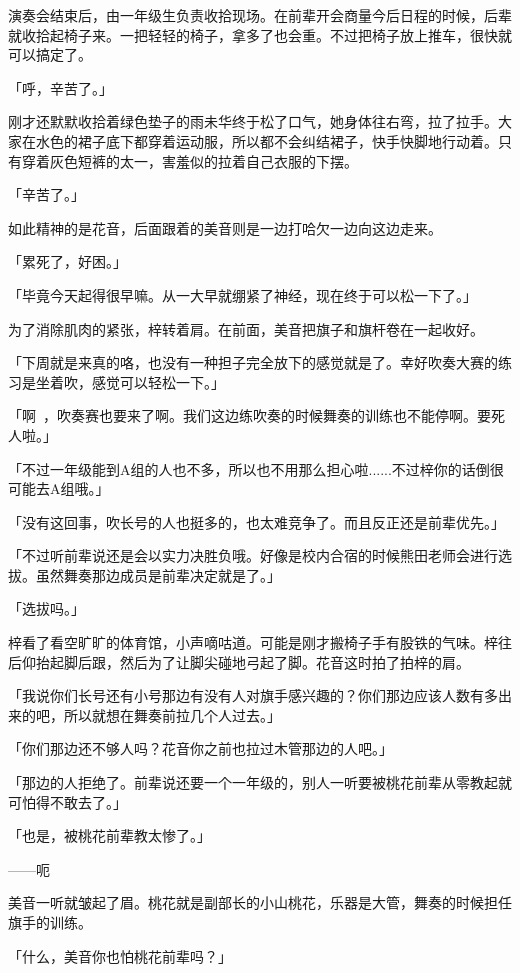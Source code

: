 \documentclass[UTF8]{ctexart}
\begin{document}
    演奏会结束后，由一年级生负责收拾现场。在前辈开会商量今后日程的时候，后辈就收拾起椅子来。一把轻轻的椅子，拿多了也会重。不过把椅子放上推车，很快就可以搞定了。

    「呼，辛苦了。」

    刚才还默默收拾着绿色垫子的雨未华终于松了口气，她身体往右弯，拉了拉手。大家在水色的裙子底下都穿着运动服，所以都不会纠结裙子，快手快脚地行动着。只有穿着灰色短裤的太一，害羞似的拉着自己衣服的下摆。

    「辛苦了。」

    如此精神的是花音，后面跟着的美音则是一边打哈欠一边向这边走来。

    「累死了，好困。」

    「毕竟今天起得很早嘛。从一大早就绷紧了神经，现在终于可以松一下了。」

    为了消除肌肉的紧张，梓转着肩。在前面，美音把旗子和旗杆卷在一起收好。

    「下周就是来真的咯，也没有一种担子完全放下的感觉就是了。幸好吹奏大赛的练习是坐着吹，感觉可以轻松一下。」

    「啊~，吹奏赛也要来了啊。我们这边练吹奏的时候舞奏的训练也不能停啊。要死人啦。」

    「不过一年级能到A组的人也不多，所以也不用那么担心啦......不过梓你的话倒很可能去A组哦。」

    「没有这回事，吹长号的人也挺多的，也太难竞争了。而且反正还是前辈优先。」

    「不过听前辈说还是会以实力决胜负哦。好像是校内合宿的时候熊田老师会进行选拔。虽然舞奏那边成员是前辈决定就是了。」

    「选拔吗。」

    梓看了看空旷旷的体育馆，小声嘀咕道。可能是刚才搬椅子手有股铁的气味。梓往后仰抬起脚后跟，然后为了让脚尖碰地弓起了脚。花音这时拍了拍梓的肩。

    「我说你们长号还有小号那边有没有人对旗手感兴趣的？你们那边应该人数有多出来的吧，所以就想在舞奏前拉几个人过去。」

    「你们那边还不够人吗？花音你之前也拉过木管那边的人吧。」

    「那边的人拒绝了。前辈说还要一个一年级的，别人一听要被桃花前辈从零教起就可怕得不敢去了。」

    「也是，被桃花前辈教太惨了。」

    ——呃

    美音一听就皱起了眉。桃花就是副部长的小山桃花，乐器是大管，舞奏的时候担任旗手的训练。

    「什么，美音你也怕桃花前辈吗？」
\end{document}
